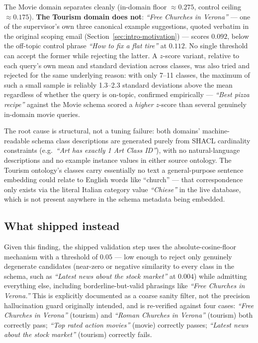 The Movie domain separates cleanly (in-domain floor $\approx 0.275$, control ceiling $\approx
0.175$). \textbf{The Tourism domain does not}: \emph{``Free Churches in Verona''} --- one of the
supervisor's own three canonical example suggestions, quoted verbatim in the original scoping email
(Section~\ref{sec:intro-motivation}) --- scores $0.092$, below the off-topic control phrase
\emph{``How to fix a flat tire''} at $0.112$. No single threshold can accept the former while
rejecting the latter. A $z$-score variant, relative to each query's own mean and standard deviation
across classes, was also tried and rejected for the same underlying reason: with only 7--11 classes,
the maximum of such a small sample is reliably 1.3--2.3 standard deviations above the mean
regardless of whether the query is on-topic, confirmed empirically --- \emph{``Best pizza recipe''}
against the Movie schema scored a \emph{higher} $z$-score than several genuinely in-domain movie
queries.

The root cause is structural, not a tuning failure: both domains' machine-readable schema class
descriptions are generated purely from SHACL cardinality constraints (e.g.\ \emph{``Art has exactly
1 Art Class ID''}), with no natural-language descriptions and no example instance values in either
source ontology. The Tourism ontology's classes carry essentially no text a general-purpose sentence
embedding could relate to English words like ``church'' --- that correspondence only exists via the
literal Italian category value \emph{``Chiese''} in the live database, which is not present anywhere
in the schema metadata being embedded.

\subsection{What shipped instead}

Given this finding, the shipped validation step uses the absolute-cosine-floor mechanism with a
threshold of $0.05$ --- low enough to reject only genuinely degenerate candidates (near-zero or
negative similarity to every class in the schema, such as \emph{``Latest news about the stock
market''} at $0.004$) while admitting everything else, including borderline-but-valid phrasings like
\emph{``Free Churches in Verona.''} This is explicitly documented as a coarse sanity filter, not the
precision hallucination guard originally intended, and is re-verified against four cases:
\emph{``Free Churches in Verona''} (tourism) and \emph{``Roman Churches in Verona''} (tourism) both
correctly pass; \emph{``Top rated action movies''} (movie) correctly passes; \emph{``Latest news
about the stock market''} (tourism) correctly fails.

